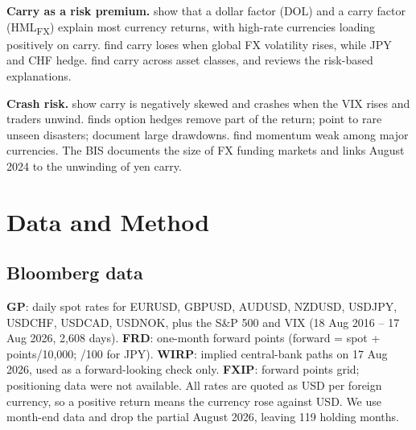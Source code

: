 \documentclass[11pt,a4paper]{article}
\begin{document}
\textbf{Carry as a risk premium.} \citet{lrv2011} show that a dollar factor (DOL) and a carry factor (HML\textsubscript{FX})
explain most currency returns, with high-rate currencies loading positively on carry. \citet{msss2012a} find carry loses
when global FX volatility rises, while JPY and CHF hedge. \citet{koijen2018} find carry across asset classes, and
\citet{burnside2012} reviews the risk-based explanations.

\textbf{Crash risk.} \citet{bnp2009} show carry is negatively skewed and crashes when the VIX rises and traders unwind.
\citet{jurek2014} finds option hedges remove part of the return; \citet{burnside2011} point to rare unseen disasters;
\citet{dhl2017} document large drawdowns. \citet{msss2012b} find momentum weak among major currencies. The BIS
\citep{bis2025,bis2024} documents the size of FX funding markets and links August 2024 to the unwinding of yen carry.

\section{Data and Method}
\subsection{Bloomberg data}
\textbf{GP}: daily spot rates for EURUSD, GBPUSD, AUDUSD, NZDUSD, USDJPY, USDCHF, USDCAD, USDNOK, plus the S\&P 500 and VIX
(18 Aug 2016 -- 17 Aug 2026, 2,608 days). \textbf{FRD}: one-month forward points (forward = spot + points/10,000; /100 for
JPY). \textbf{WIRP}: implied central-bank paths on 17 Aug 2026, used as a forward-looking check only. \textbf{FXIP}: forward
points grid; positioning data were not available. All rates are quoted as USD per foreign currency, so a positive return
means the currency rose against USD. We use month-end data and drop the partial August 2026, leaving 119 holding months.
\end{document}
